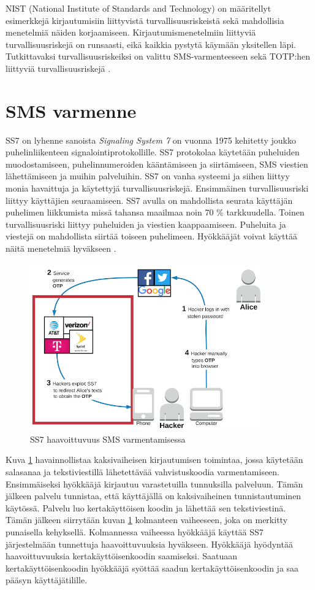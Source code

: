 NIST (National Institute of Standards and Technology) on määritellyt esimerkkejä kirjautumisiin liittyvistä turvallisuusriskeistä sekä mahdollisia menetelmiä näiden korjaamiseen. Kirjautumismenetelmiin liittyviä turvallisuusriskejä on runsaasti, eikä kaikkia pystytä käymään yksitellen läpi. Tutkittavaksi turvallisuusriskeiksi on valittu SMS-varmenteeseen sekä TOTP:hen liittyviä turvallisuusriskejä \citep{NIST_800_63B}.


\section{SMS varmenne}
SS7 on lyhenne sanoista \emph{Signaling System 7} on vuonna 1975 kehitetty joukko puhelinliikenteen signalointiprotokollille. SS7 protokolaa käytetään puheluiden muodostamiseen, puhelinnumeroiden kääntämiseen ja siirtämiseen, SMS viestien lähettämiseen ja muihin palveluihin. SS7 on vanha systeemi ja siihen liittyy monia havaittuja ja käytettyjä turvallisuusriskejä. Ensimmäinen turvallisuusriski liittyy käyttäjien seuraamiseen. SS7 avulla on mahdollista seurata käyttäjän puhelimen liikkumista missä tahansa maailmaa noin 70 \% tarkkuudella. Toinen turvallisuusriski liittyy puheluiden ja viestien kaappaamiseen. Puheluita ja viestejä on mahdollista siirtää toiseen puhelimeen. Hyökkääjät voivat käyttää näitä menetelmiä hyväkseen \citep{ss7}.


\begin{figure}[ht]
    \centering
    \includegraphics[width=10cm]{template/figures/SS7 attack vulnerable.png}
    \caption{SS7 haavoittuvuus SMS varmentamisessa \citep{2FA_SMS}}
    \label{fig:ss7SMSM}
\end{figure}

Kuva \ref{fig:ss7SMSM} havainnollistaa kaksivaiheisen kirjautumisen toimintaa, jossa käytetään salasanaa ja tekstiviestillä lähetettävää vahvistuskoodia varmentamiseen. Ensimmäiseksi hyökkääjä kirjautuu varastetuilla tunnuksilla palveluun. Tämän jälkeen palvelu tunnistaa, että käyttäjällä on kaksivaiheinen tunnistautuminen käytössä. Palvelu luo kertakäyttöisen koodin ja lähettää sen tekstiviestinä. Tämän jälkeen siirrytään kuvan \ref{fig:ss7SMSM} kolmanteen vaiheeseen, joka on merkitty punaisella kehyksellä. Kolmannessa vaiheessa hyökkääjä käyttää SS7 järjestelmään tunnettuja haavoittuvuuksia hyväkseen. Hyökkääjä hyödyntää haavoittuvuuksia kertakäyttöisenkoodin saamiseksi. Saatuaan kertakäyttöisenkoodin hyökkääjä syöttää saadun kertakäyttöisenkoodin ja saa pääsyn käyttäjätilille. 


